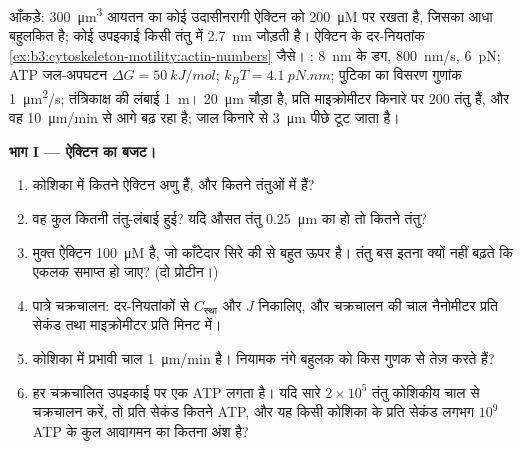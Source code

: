 \begin{problem}
\label{pb:b3:cytoskeleton-motility:1}
आँकड़े: \qty{300}{\micro m^3} आयतन का कोई उदासीनरागी ऐक्टिन को
\qty{200}{\micro M} पर रखता है, जिसका आधा बहुलकित है; कोई उपइकाई किसी
तंतु में \qty{2.7}{nm} जोड़ती है। ऐक्टिन के दर-नियतांक
\cref{ex:b3:cytoskeleton-motility:actin-numbers} जैसे। :
\qty{8}{nm} के डग, \qty{800}{nm/s},  \qty{6}{pN}; ATP जल-अपघटन
$\Delta G = \qty{50}{kJ/mol}$; $k_{B}T = \qty{4.1}{pN.nm}$; पुटिका का
विसरण गुणांक \qty{1}{\micro m^2/s}; तंत्रिकाक्ष की लंबाई \qty{1}{m}।
 \qty{20}{\micro m} चौड़ा है, प्रति माइक्रोमीटर किनारे पर $200$
तंतु हैं, और वह \qty{10}{\micro m/min} से आगे बढ़ रहा है; जाल किनारे से
\qty{3}{\micro m} पीछे टूट जाता है।

\medskip
\noindent\textbf{भाग I --- ऐक्टिन का बजट।}
\begin{enumerate}
  \item कोशिका में कितने ऐक्टिन अणु हैं, और कितने तंतुओं में हैं?
  \item वह कुल कितनी तंतु-लंबाई हुई? यदि औसत तंतु
        \qty{0.25}{\micro m} का हो तो कितने तंतु?
  \item मुक्त ऐक्टिन \qty{100}{\micro M} है, जो काँटेदार सिरे की
         से बहुत ऊपर है। तंतु बस इतना क्यों नहीं
        बढ़ते कि एकलक समाप्त हो जाए? (दो प्रोटीन।)
  \item पात्रे चक्रचालन: दर-नियतांकों से $C_{\text{स्था}}$ और $J$
        निकालिए, और चक्रचालन की चाल नैनोमीटर प्रति सेकंड तथा
        माइक्रोमीटर प्रति मिनट में।
  \item कोशिका में प्रभावी चाल \qty{1}{\micro m/min} है। नियामक नंगे
        बहुलक को किस गुणक से तेज़ करते हैं?
  \item हर चक्रचालित उपइकाई पर एक ATP लगता है। यदि सारे $2\times 10^{5}$
        तंतु कोशिकीय चाल से चक्रचालन करें, तो प्रति सेकंड कितने ATP, और
        यह किसी कोशिका के प्रति सेकंड लगभग $10^{9}$ ATP के कुल आवागमन
        का कितना अंश है?
\end{enumerate}


\end{problem}

